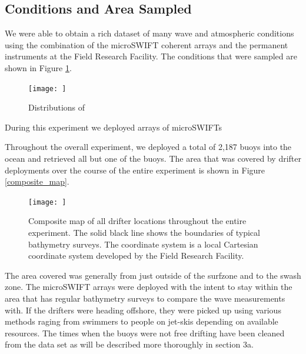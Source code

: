 \documentclass[essd, manuscript]{copernicus}
\begin{document}
\subsection{Conditions and Area Sampled}
We were able to obtain a rich dataset of many wave and atmospheric conditions using the combination of the microSWIFT coherent arrays and the permanent instruments at the Field Research Facility. The conditions that were sampled are shown in Figure \ref{fig:2}.

\begin{figure}
    \centering
    \texttt{[image: ]}
    \caption{Distributions of  }
    \label{fig:2}
\end{figure}

During this experiment we deployed arrays of microSWIFTs 

Throughout the overall experiment, we deployed a total of 2,187 buoys into the ocean and retrieved all but one of the buoys. The area that was covered by drifter deployments over the course of the entire experiment is shown in Figure \ref{composite_map}. 

\begin{figure}
    \centering
    \texttt{[image: ]}
    \caption{Composite map of all drifter locations throughout the entire experiment. The solid black line shows the boundaries of typical bathymetry surveys. The coordinate system is a local Cartesian coordinate system developed by the Field Research Facility. }
    \label{fig:composite_map}
\end{figure}
 
The area covered was generally from just outside of the surfzone and to the swash zone. The microSWIFT arrays were deployed with the intent to stay within the area that has regular bathymetry surveys to compare the wave measurements with. If the drifters were heading offshore, they were picked up using various methods raging from swimmers to people on jet-skis depending on available resources. The times when the buoys were not free drifting have been cleaned from the data set as will be described more thoroughly in section 3a. 
\end{document}
